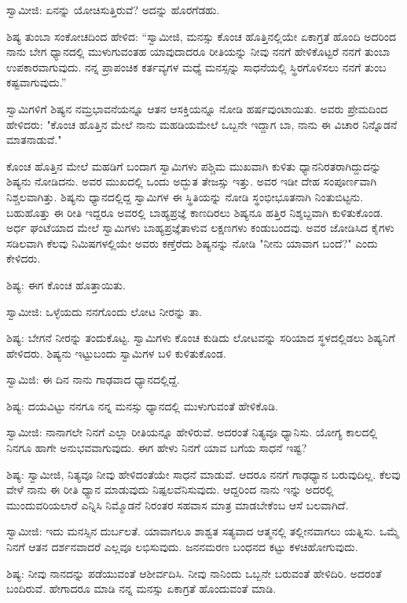 ಸ್ವಾಮೀಜಿ: ಏನನ್ನು ಯೋಚಿಸುತ್ತಿರುವೆ? ಅದನ್ನು ಹೊರಗೆಡಹು.

ಶಿಷ್ಯ ತುಂಬಾ ಸಂಕೋಚದಿಂದ ಹೇಳಿದ: “ಸ್ವಾಮೀಜಿ, ಮನಸ್ಸು ಕೊಂಚ ಹೊತ್ತಿನಲ್ಲಿಯೇ ಏಕಾಗ್ರತೆ ಹೊಂದಿ ಅದರಿಂದ ನಾನು ಬೇಗ ಧ್ಯಾನದಲ್ಲಿ ಮುಳುಗುವಂತಹ ಯಾವುದಾದರೂ ರೀತಿಯನ್ನು ನೀವು ನನಗೆ ಹೇಳಿಕೊಟ್ಟರೆ ನನಗೆ ತುಂಬಾ ಉಪಕಾರವಾಗುವುದು. ನನ್ನ ಪ್ರಾಪಂಚಿಕ ಕರ್ತವ್ಯಗಳ ಮಧ್ಯೆ ಮನಸ್ಸನ್ನು ಸಾಧನೆಯಲ್ಲಿ ಸ್ಥಿರಗೊಳಿಸಲು ನನಗೆ ತುಂಬ ಕಷ್ಟವಾಗುವುದು.”

ಸ್ವಾಮಿಗಳಿಗೆ ಶಿಷ್ಯನ ನಮ್ರಭಾವನೆಯನ್ನೂ ಆತನ ಆಸಕ್ತಿಯನ್ನೂ ನೋಡಿ ಹರ್ಷವುಂಟಾಯಿತು. ಅವರು ಪ್ರೇಮದಿಂದ ಹೇಳಿದರು: "ಕೊಂಚ ಹೊತ್ತಿನ ಮೇಲೆ ನಾನು ಮಹಡಿಯಮೇಲೆ ಒಬ್ಬನೇ ಇದ್ದಾಗ ಬಾ, ನಾನು ಈ ವಿಚಾರ ನಿನ್ನೊಡನೆ ಮಾತನಾಡುವೆ."

ಕೊಂಚ ಹೊತ್ತಿನ ಮೇಲೆ ಮಹಡಿಗೆ ಬಂದಾಗ ಸ್ವಾಮಿಗಳು ಪಶ್ಚಿಮ ಮುಖವಾಗಿ ಕುಳಿತು ಧ್ಯಾನನಿರತರಾಗಿದ್ದುದನ್ನು ಶಿಷ್ಯನು ನೋಡಿದನು. ಅವರ ಮುಖದಲ್ಲಿ ಒಂದು ಅದ್ಭುತ ತೇಜಸ್ಸು ಇತ್ತು. ಅವರ ಇಡೀ ದೇಹ ಸಂಪೂರ್ಣವಾಗಿ ನಿಶ್ಚಲವಾಗಿತ್ತು. ಶಿಷ್ಯನು ಧ್ಯಾನದಲ್ಲಿದ್ದ ಸ್ವಾಮಿಗಳ ಈ ಸ್ಥಿತಿಯನ್ನು ನೋಡಿ ಸ್ಥಂಭೀಭೂತನಾಗಿ ನಿಂತುಬಿಟ್ಟನು. ಬಹುಹೊತ್ತು ಈ ರೀತಿ ಇದ್ದರೂ ಅವರಲ್ಲಿ ಬಾಹ್ಯಪ್ರಜ್ಞೆ ಕಾಣದಿರಲು ಶಿಷ್ಯನೂ ಹತ್ತಿರ ನಿಶ್ಶಬ್ದವಾಗಿ ಕುಳಿತುಕೊಂಡ. ಅರ್ಧ ಘಂಟೆಯಾದ ಮೇಲೆ ಸ್ವಾಮಿಗಳು ಬಾಹ್ಯಪ್ರಜ್ಞೆತಾಳುವ ಲಕ್ಷಣಗಳು ಕಂಡುಬಂದವು. ಅವರ ಜೋಡಿಸಿದ ಕೈಗಳು ಸಡಿಲವಾಗಿ ಕೆಲವು ನಿಮಿಷಗಳಲ್ಲಿಯೇ ಅವರು ಕಣ್ತೆರೆದು ಶಿಷ್ಯನನ್ನು ನೋಡಿ "ನೀನು ಯಾವಾಗ ಬಂದೆ?" ಎಂದು ಕೇಳಿದರು.

ಶಿಷ್ಯ: ಈಗ ಕೊಂಚ ಹೊತ್ತಾಯಿತು.

ಸ್ವಾಮೀಜಿ: ಒಳ್ಳೆಯದು ನನಗೊಂದು ಲೋಟ ನೀರನ್ನು ತಾ.

ಶಿಷ್ಯ: ಬೇಗನೆ ನೀರನ್ನು ತಂದುಕೊಟ್ಟ. ಸ್ವಾಮಿಗಳು ಕೊಂಚ ಕುಡಿದು ಲೋಟವನ್ನು ಸರಿಯಾದ ಸ್ಥಳದಲ್ಲಿಡಲು ಶಿಷ್ಯನಿಗೆ ಹೇಳಿದರು. ಶಿಷ್ಯನು ಇಟ್ಟುಬಂದು ಸ್ವಾಮಿಗಳ ಬಳಿ ಕುಳಿತುಕೊಂಡ.

ಸ್ವಾಮಿಜಿ: ಈ ದಿನ ನಾನು ಗಾಢವಾದ ಧ್ಯಾನದಲ್ಲಿದ್ದೆ.

ಶಿಷ್ಯ: ದಯವಿಟ್ಟು ನನಗೂ ನನ್ನ ಮನಸ್ಸು ಧ್ಯಾನದಲ್ಲಿ ಮುಳುಗುವಂತೆ ಹೇಳಿಕೊಡಿ.

ಸ್ವಾಮೀಜಿ: ನಾನಾಗಲೇ ನಿನಗೆ ಎಲ್ಲಾ ರೀತಿಯನ್ನೂ ಹೇಳಿರುವೆ. ಅದರಂತೆ ನಿತ್ಯವೂ ಧ್ಯಾನಿಸು. ಯೋಗ್ಯ ಕಾಲದಲ್ಲಿ ನಿನಗೂ ಹಾಗೇ ಅನುಭವವಾಗುವುದು. ಈಗ ಹೇಳು ನಿನಗೆ ಯಾವ ಬಗೆಯ ಸಾಧನೆ ಇಷ್ಟ?

ಶಿಷ್ಯ: ಸ್ವಾಮೀಜಿ, ನಿತ್ಯವೂ ನೀವು ಹೇಳಿದಂತೆಯೇ ಸಾಧನೆ ಮಾಡುವೆ. ಆದರೂ ನನಗೆ ಗಾಢಧ್ಯಾನ ಬರುವುದಿಲ್ಲ. ಕೆಲವು ವೇಳೆ ನಾನು ಈ ರೀತಿ ಧ್ಯಾನ ಮಾಡುವುದು ನಿಷ್ಪಲವೆನಿಸುವುದು. ಆದ್ದರಿಂದ ನಾನು ಇನ್ನು ಅದರಲ್ಲಿ ಮುಂದುವರಿಯಲಾರೆ ಎನ್ನಿಸಿ ನಿಮ್ಮೊಡನೆ ನಿರಂತರ ಸಹವಾಸ ಮಾತ್ರ ಮಾಡಬೇಕೆಂಬ ಆಸೆ ಬಲವಾಗಿದೆ.

ಸ್ವಾಮೀಜಿ: ಇದು ಮನಸ್ಸಿನ ದುರ್ಬಲತೆ. ಯಾವಾಗಲೂ ಶಾಶ್ವತ ಸತ್ಯವಾದ ಆತ್ಮನಲ್ಲಿ ತಲ್ಲೀನವಾಗಲು ಯತ್ನಿಸು. ಒಮ್ಮೆ ನಿನಗೆ ಆತನ ದರ್ಶನವಾದರೆ ಎಲ್ಲವೂ ಲಭಿಸುವುದು. ಜನನಮರಣ ಬಂಧನದ ಕಟ್ಟು ಕಳಚಿಹೋಗುವುದು.

ಶಿಷ್ಯ: ನೀವು ನಾನದನ್ನು ಪಡೆಯುವಂತೆ ಆಶೀರ್ವದಿಸಿ. ನೀವು ನಾನಿಂದು ಒಬ್ಬನೇ ಬರುವಂತೆ ಹೇಳಿದಿರಿ. ಅದರಂತೆ ಬಂದಿರುವೆ. ಹೇಗಾದರೂ ಮಾಡಿ ನನ್ನ ಮನಸ್ಸು ಏಕಾಗ್ರತೆ ಹೊಂದುವಂತೆ ಮಾಡಿ.


